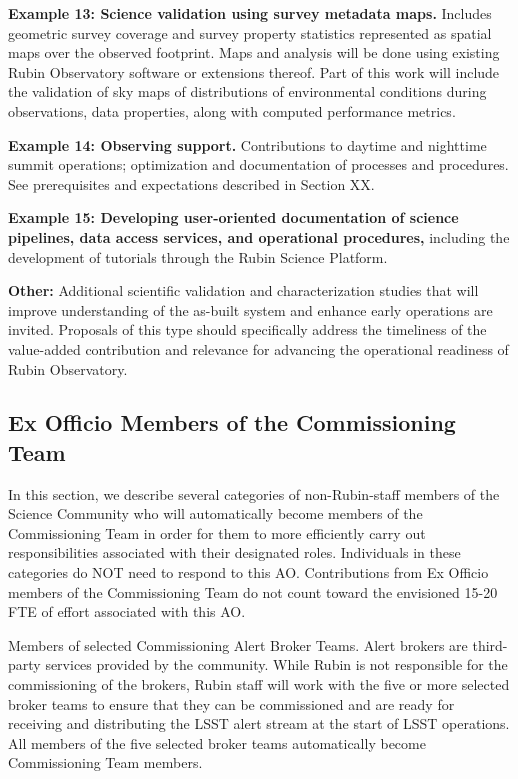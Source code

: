 \documentclass[SE,authoryear,toc]{lsstdoc}
\begin{document}
\textbf{Example 13: Science validation using survey metadata maps.} Includes geometric survey coverage and survey property statistics represented as spatial maps over the observed footprint.  Maps and analysis will be done using existing Rubin Observatory software or extensions thereof.  Part of this work will include the validation of sky maps of distributions of environmental conditions during observations, data properties, along with computed performance metrics.

\textbf{Example 14: Observing support.} Contributions to daytime and nighttime summit operations; optimization and documentation of processes and procedures. See prerequisites and expectations described in Section XX.

\textbf{Example 15: Developing user-oriented documentation of science pipelines, data access services, and operational procedures,} including the development of tutorials through the Rubin Science Platform.

\textbf{Other:} Additional scientific validation and characterization studies that will improve understanding of the as-built system and enhance early operations are invited. Proposals of this type should specifically address the timeliness of the value-added contribution and relevance for advancing the operational readiness of Rubin Observatory.

\subsection{Ex Officio Members of the Commissioning Team}

In this section, we describe several categories of non-Rubin-staff members of the Science Community who will automatically become members of the Commissioning Team in order for them to more efficiently carry out responsibilities associated with their designated roles. Individuals in these categories do NOT need to respond to this AO. Contributions from Ex Officio members of the Commissioning Team do not count toward the envisioned 15-20 FTE of effort associated with this AO. 

Members of selected Commissioning Alert Broker Teams. Alert brokers are third-party services provided by the community. While Rubin is not responsible for the commissioning of the brokers, Rubin staff will work with the five or more selected broker teams to ensure that they can be commissioned and are ready for receiving and distributing the LSST alert stream at the start of LSST operations.  All members of the five selected broker teams automatically become Commissioning Team members.
\end{document}
